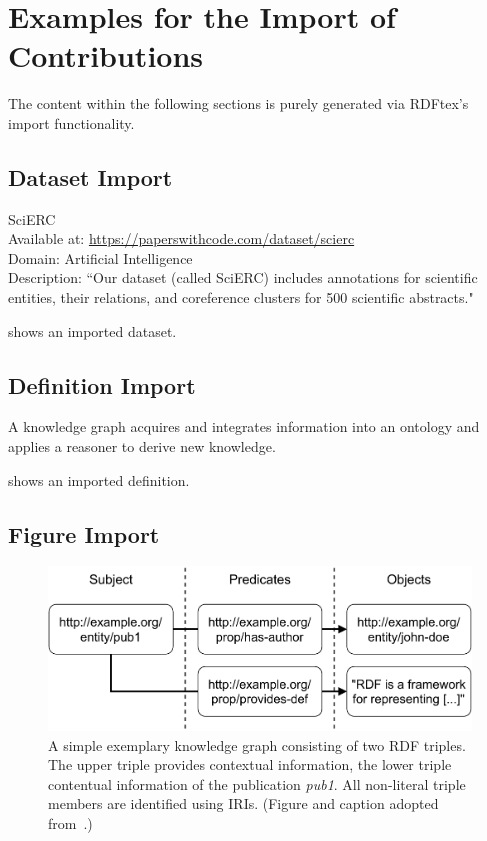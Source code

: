 
\section{Examples for the Import of Contributions}

The content within the following sections is purely generated via RDFtex's import functionality.

\subsection{Dataset Import}


 \begin{dataset}
 SciERC~\cite{DBLP:conf/emnlp/LuanHOH18}\\
 Available at: \url{https://paperswithcode.com/dataset/scierc}\\
 Domain: Artificial Intelligence\\
 Description: ``Our dataset (called SciERC) includes annotations for scientific entities, their relations, and coreference clusters for 500 scientific abstracts."~\cite{DBLP:conf/emnlp/LuanHOH18}
 \label{dataset:scierc}
 \end{dataset}
 
 shows an imported dataset.

\subsection{Definition Import}


 \begin{definition}
 \label{def:knowledge-graph}
 A knowledge graph acquires and integrates information into an ontology and applies a reasoner to derive new knowledge.
 \end{definition}
 
 shows an imported definition.

\subsection{Figure Import}


 \begin{figure}[htb!]
 \centering
 \includegraphics[max width=0.7\columnwidth]{./figures/triple_example}
 \caption{A simple exemplary knowledge graph consisting of two RDF triples. The upper triple provides contextual information, the lower triple contentual information of the publication \emph{{pub1}}. All non-literal triple members are identified using IRIs. (Figure and caption adopted from~\cite{Martin21}.)}
 \label{fig:contentual-contextual}
 \end{figure}
 
